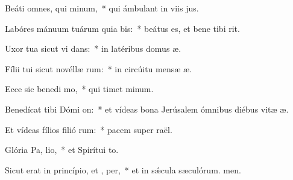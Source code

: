\item Beáti omnes, qui  minum,~* qui ámbulant in viis jus.
\item Labóres mánuum tuárum quia bis:~* beátus es, et bene tibi rit.
\item Uxor tua sicut vi dans:~* in latéribus domus æ.
\item Fílii tui sicut novéllæ rum:~* in circúitu mensæ æ.
\item Ecce sic benedi mo,~* qui timet minum.
\item Benedícat tibi Dómi  on:~* et vídeas bona Jerúsalem ómnibus diébus vitæ æ.
\item Et vídeas fílios filió rum:~* pacem super raël.
\item Glória Pa,  lio,~* et Spirítui to.
\item Sicut erat in princípio, et ,  per,~* et in sǽcula sæculórum. men.
